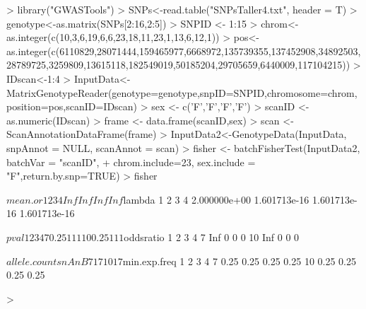 \documentclass[12pt]{article}
\begin{document}
\begin{Schunk}
\begin{Sinput}
> library("GWASTools")
> SNPs<-read.table("SNPsTaller4.txt", header = T)
> genotype<-as.matrix(SNPs[2:16,2:5])
> SNPID <- 1:15
> chrom<-as.integer(c(10,3,6,19,6,6,23,18,11,23,1,13,6,12,1))
> pos<-as.integer(c(6110829,28071444,159465977,6668972,135739355,137452908,34892503,28789725,3259809,13615118,182549019,50185204,29705659,6440009,117104215))
> IDscan<-1:4
> InputData<-MatrixGenotypeReader(genotype=genotype,snpID=SNPID,chromosome=chrom,position=pos,scanID=IDscan)
> sex <- c('F','F','F','F')
> scanID <- as.numeric(IDscan)
> frame <- data.frame(scanID,sex)
> scan <- ScanAnnotationDataFrame(frame)
> InputData2<-GenotypeData(InputData, snpAnnot = NULL, scanAnnot = scan)
> fisher <- batchFisherTest(InputData2, batchVar = "scanID",
+                           chrom.include=23, sex.include = "F",return.by.snp=TRUE)
> fisher
\end{Sinput}
\begin{Soutput}
$mean.or
  1   2   3   4 
Inf Inf Inf Inf 

$lambda
           1            2            3            4 
2.000000e+00 1.601713e-16 1.601713e-16 1.601713e-16 

$pval
      1 2 3 4
7  0.25 1 1 1
10 0.25 1 1 1

$oddsratio
     1 2 3 4
7  Inf 0 0 0
10 Inf 0 0 0

$allele.counts
   nA nB
7   1  7
10  1  7

$min.exp.freq
      1    2    3    4
7  0.25 0.25 0.25 0.25
10 0.25 0.25 0.25 0.25
\end{Soutput}
\begin{Sinput}
> 
\end{Sinput}
\end{Schunk}
\end{document}

